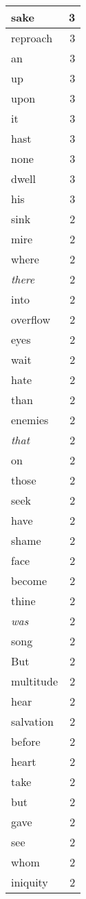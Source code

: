 \begin{center}
\begin{longtable}{l|r}
sake & 3\\ \hline 
reproach & 3\\ \hline 
an & 3\\ \hline 
up & 3\\ \hline 
upon & 3\\ \hline 
it & 3\\ \hline 
hast & 3\\ \hline 
none & 3\\ \hline 
dwell & 3\\ \hline 
his & 3\\ \hline 
sink & 2\\ \hline 
mire & 2\\ \hline 
where & 2\\ \hline 
\emph{there} & 2\\ \hline 
into & 2\\ \hline 
overflow & 2\\ \hline 
eyes & 2\\ \hline 
wait & 2\\ \hline 
hate & 2\\ \hline 
than & 2\\ \hline 
enemies & 2\\ \hline 
\emph{that} & 2\\ \hline 
on & 2\\ \hline 
those & 2\\ \hline 
seek & 2\\ \hline 
have & 2\\ \hline 
shame & 2\\ \hline 
face & 2\\ \hline 
become & 2\\ \hline 
thine & 2\\ \hline 
\emph{was} & 2\\ \hline 
song & 2\\ \hline 
But & 2\\ \hline 
multitude & 2\\ \hline 
hear & 2\\ \hline 
salvation & 2\\ \hline 
before & 2\\ \hline 
heart & 2\\ \hline 
take & 2\\ \hline 
but & 2\\ \hline 
gave & 2\\ \hline 
see & 2\\ \hline 
whom & 2\\ \hline 
iniquity & 2\\ \hline 

\end{longtable}
\end{center}
